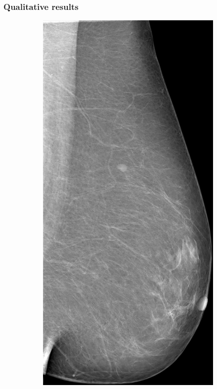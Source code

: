 \documentclass{beamer}
\begin{document}
    
    \begin{frame}
        \frametitle{Qualitative results}  
        \begin{figure}
            \centering
            \begin{subfigure}{0.134\textwidth}
	            \centering
		            \includegraphics[width=\textwidth]{plots/examples/mammogram_1.png}

\end{subfigure}
\end{figure}
\end{frame}
\end{document}
